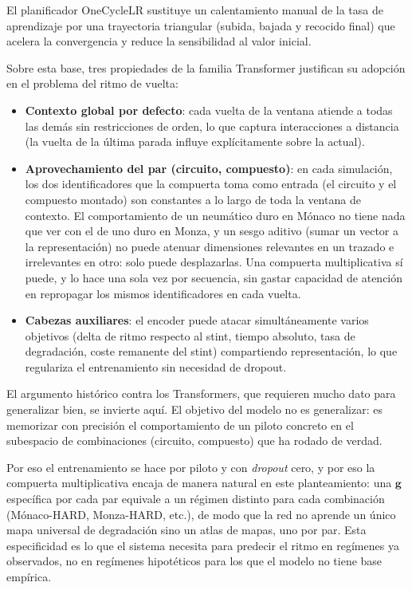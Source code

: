 El planificador OneCycleLR \cite{pytorchonecyclelr} sustituye un calentamiento manual de la tasa de aprendizaje por una trayectoria triangular (subida, bajada y recocido final) que acelera la convergencia y reduce la sensibilidad al valor inicial.

Sobre esta base, tres propiedades de la familia Transformer justifican su adopción en el problema del ritmo de vuelta:

\begin{itemize}
    \item \textbf{Contexto global por defecto}: cada vuelta de la ventana atiende a todas las demás sin restricciones de orden, lo que captura interacciones a distancia (la vuelta de la última parada influye explícitamente sobre la actual).
    \item \textbf{Aprovechamiento del par (circuito, compuesto)}: en cada simulación, los dos identificadores que la compuerta toma como entrada (el circuito y el compuesto montado) son constantes a lo largo de toda la ventana de contexto. El comportamiento de un neumático duro en Mónaco no tiene nada que ver con el de uno duro en Monza, y un sesgo aditivo (sumar un vector a la representación) no puede atenuar dimensiones relevantes en un trazado e irrelevantes en otro: solo puede desplazarlas. Una compuerta multiplicativa sí puede, y lo hace una sola vez por secuencia, sin gastar capacidad de atención en repropagar los mismos identificadores en cada vuelta.
    \item \textbf{Cabezas auxiliares}: el encoder puede atacar simultáneamente varios objetivos (delta de ritmo respecto al stint, tiempo absoluto, tasa de degradación, coste remanente del stint) compartiendo representación, lo que regulariza el entrenamiento sin necesidad de dropout.
\end{itemize}

El argumento histórico contra los Transformers, que requieren mucho dato para generalizar bien, se invierte aquí. El objetivo del modelo no es generalizar: es memorizar con precisión el comportamiento de un piloto concreto en el subespacio de combinaciones (circuito, compuesto) que ha rodado de verdad. 

Por eso el entrenamiento se hace por piloto y con \textit{dropout} cero, y por eso la compuerta multiplicativa encaja de manera natural en este planteamiento: una $\mathbf{g}$ específica por cada par equivale a un régimen distinto para cada combinación (Mónaco-HARD, Monza-HARD, etc.), de modo que la red no aprende un único mapa universal de degradación sino un atlas de mapas, uno por par. Esta especificidad es lo que el sistema necesita para predecir el ritmo en regímenes ya observados, no en regímenes hipotéticos para los que el modelo no tiene base empírica.

